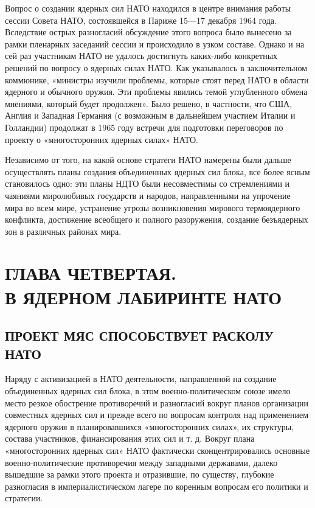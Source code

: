 \documentclass[12pt, a4paper, openany]{book}
\begin{document}
		Вопрос о создании ядерных сил НАТО находился в центре внимания работы сессии Совета НАТО, состоявшейся в Париже 15—17 декабря 1964 года. Вследствие острых разногласий обсуждение этого вопроса было вынесено за рамки пленарных заседаний сессии и происходило в узком составе. Однако и на сей раз участникам НАТО не удалось достигнуть каких-либо конкретных решений по вопросу о ядерных силах НАТО. Как указывалось в заключительном коммюнике, «министры изучили проблемы, которые стоят перед НАТО в области ядерного и обычного оружия. Эти проблемы явились темой углубленного обмена мнениями, который будет продолжен». Было решено, в частности, что США, Англия и Западная Германия (с возможным в дальнейшем участием Италии и Голландии) продолжат в 1965 году встречи для подготовки переговоров по проекту о «многосторонних ядерных силах» НАТО.
		
		Независимо от того, на какой основе стратеги НАТО намерены были дальше осуществлять планы создания объединенных ядерных сил блока, все более ясным становилось одно: эти планы НДТО были несовместимы со стремлениями и чаяниями миролюбивых государств и народов, направленными на упрочение мира во всем мире, устранение угрозы возникновения мирового термоядерного конфликта, достижение всеобщего и полного разоружения, создание безъядерных зон в различных районах мира.
		
		\newpage
		\section[Глава четвертая. В ядерном лабиринте НАТО]{\center ГЛАВА ЧЕТВЕРТАЯ.\\ \textbf{В ЯДЕРНОМ ЛАБИРИНТЕ НАТО}}	
		\subsection[Проект МЯС способствует расколу НАТО]{\center ПРОЕКТ МЯС СПОСОБСТВУЕТ РАСКОЛУ НАТО}	
		
		Наряду с активизацией в НАТО деятельности, направленной на создание объединенных ядерных сил блока, в этом военно-политическом союзе имело место резкое обострение противоречий и разногласий вокруг планов организации совместных ядерных сил и прежде всего по вопросам контроля над применением ядерного оружия в планировавшихся «многосторонних силах», их структуры, состава участников, финансирования этих сил и т. д. Вокруг плана «многосторонних ядерных сил» НАТО фактически сконцентрировались основные военно-политические противоречия между западными державами, далеко вышедшие за рамки этого проекта и отразившие, по существу, глубокие разногласия в империалистическом лагере по коренным вопросам его политики и стратегии.
		
\end{document}
